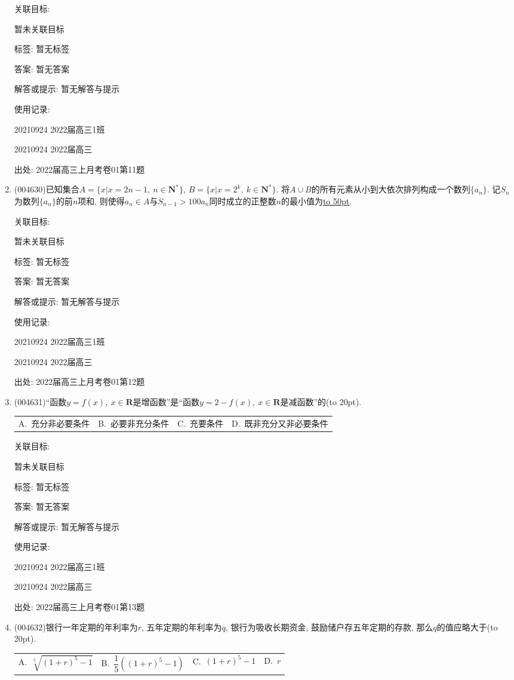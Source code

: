 \documentclass[10pt,a4paper]{article}
\newcommand{\blank}[1]{\underline{\hbox to #1pt{}}}
\newcommand{\bracket}[1]{(\hbox to #1pt{})}
\newcommand{\fourch}[4]{\par\begin{tabular}{p{.23\textwidth}p{.23\textwidth}p{.23\textwidth}p{.23\textwidth}}
A.~#1 &B.~#2& C.~#3& D.~#4
\end{tabular}}
\begin{document}
\begin{enumerate}[1.]
关联目标:

暂未关联目标



标签: 暂无标签

答案: 暂无答案

解答或提示: 暂无解答与提示

使用记录:

20210924	2022届高三1班	

20210924	2022届高三	


出处: 2022届高三上月考卷01第11题
\item { (004630)}已知集合$A=\{x|x=2n-1, \ n\in \mathbf{N}^*\}$, $B=\{x|x=2^k, \ k\in \mathbf{N}^*\}$. 将$A\cup B$的所有元素从小到大依次排列构成一个数列$\{a_n\}$. 记$S_n$为数列$\{a_n\}$的前$n$项和, 则使得$a_n\in A$与${S_{n-1}}>100{a_n}$同时成立的正整数$n$的最小值为\blank{50}.


关联目标:

暂未关联目标



标签: 暂无标签

答案: 暂无答案

解答或提示: 暂无解答与提示

使用记录:

20210924	2022届高三1班	

20210924	2022届高三	


出处: 2022届高三上月考卷01第12题
\item { (004631)}``函数$y=f(x), \ x\in \mathbf{R}$是增函数''是``函数$y=2-f(x), \ x\in \mathbf{R}$是减函数''的\bracket{20}.
\fourch{充分非必要条件}{必要非充分条件}{充要条件}{既非充分又非必要条件}


关联目标:

暂未关联目标



标签: 暂无标签

答案: 暂无答案

解答或提示: 暂无解答与提示

使用记录:

20210924	2022届高三1班	

20210924	2022届高三	


出处: 2022届高三上月考卷01第13题
\item { (004632)}银行一年定期的年利率为$r$, 五年定期的年利率为$q$, 银行为吸收长期资金, 鼓励储户存五年定期的存款, 那么$q$的值应略大于\bracket{20}.
\fourch{$\sqrt[5]{(1+r)^5-1}$}{$\dfrac 15((1+r)^5-1)$}{$(1+r)^5-1$}{$r$}



\end{enumerate}
\end{document}

